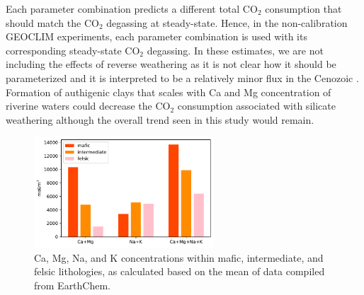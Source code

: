 \documentclass[11pt,letterpaper]{article}
\newcommand{\COtwo}{CO$_{2}$\xspace}
\begin{document}
Each parameter combination predicts a different total \COtwo consumption that should match the \COtwo degassing at steady-state. Hence, in the non-calibration GEOCLIM experiments, each parameter combination is used with its corresponding steady-state \COtwo degassing. In these estimates, we are not including the effects of reverse weathering \citep{Michalopoulos1995a} as it is not clear how it should be parameterized and it is interpreted to be a relatively minor flux in the Cenozoic \citep{Isson2018a}. Formation of authigenic clays that scales with Ca and Mg concentration of riverine waters could decrease the \COtwo consumption associated with silicate weathering although the overall trend seen in this study would remain.

\begin{figure}[h!]
    \centering
    \includegraphics[width=0.6\textwidth]{Figures/lithology_composition.pdf}
    \caption{Ca, Mg, Na, and K concentrations within mafic, intermediate, and felsic lithologies, as calculated based on the mean of data compiled from EarthChem.}
    \label{fig:lithology_composition}
\end{figure}
\end{document}
